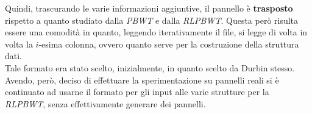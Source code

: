 Quindi, trascurando le varie informazioni aggiuntive, il pannello è
\textbf{trasposto} rispetto a quanto studiato dalla \textit{PBWT} e dalla
\textit{RLPBWT}. Questa però risulta essere una comodità in quanto, leggendo
iterativamente il file, si legge di volta in volta la $i$-esima colonna, ovvero
quanto serve per la costruzione della struttura dati.\\
Tale formato era stato scelto, inizialmente, in quanto scelto da Durbin
stesso. Avendo, però, deciso di effettuare la sperimentazione su pannelli reali
si è continuato ad usarne il formato per gli input alle varie strutture per la
\textit{RLPBWT}, senza effettivamente generare dei pannelli. 
